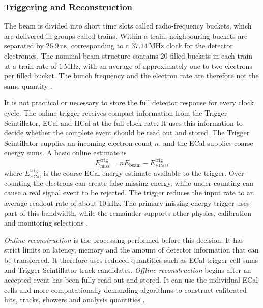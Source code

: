 \subsubsection{Triggering and Reconstruction}

The beam is divided into short time slots called radio-frequency buckets,
which are delivered in groups called trains. Within a train, neighbouring
buckets are separated by \(26.9\,\mathrm{ns}\), corresponding to a
\(37.14\,\mathrm{MHz}\) clock for the detector electronics. The nominal beam
structure contains 20 filled buckets in each train at a train rate of
\(1\,\mathrm{MHz}\), with an average of approximately one to two electrons
per filled bucket. The bunch frequency and the electron rate are therefore
not the same quantity \cite{ldmx2025-overview}.

It is not practical or necessary to store the full detector response for
every clock cycle. The online trigger receives compact information from the
Trigger Scintillator, ECal and HCal at the full clock rate. It uses this
information to decide whether the complete event should be read out and
stored. The Trigger Scintillator supplies an incoming-electron count \(n\),
and the ECal supplies coarse energy sums. A basic online estimate is
\begin{equation}
    E_{\mathrm{miss}}^{\mathrm{trig}}
    =
    nE_{\mathrm{beam}} - E_{\mathrm{ECal}}^{\mathrm{trig}} ,
\end{equation}
where \(E_{\mathrm{ECal}}^{\mathrm{trig}}\) is the coarse ECal energy estimate
available to the trigger.
Over-counting the electrons can create false missing energy, while
under-counting can cause a real signal event to be rejected. The trigger
reduces the input rate to an average readout rate of about
\(10\,\mathrm{kHz}\). The primary missing-energy trigger uses part of this
bandwidth, while the remainder supports other physics, calibration and
monitoring selections \cite{ldmx2025-overview}.

\emph{Online reconstruction} is the processing performed before this
decision. It has strict limits on latency, memory and the amount of detector
information that can be transferred. It therefore uses reduced quantities
such as ECal trigger-cell sums and Trigger Scintillator track candidates.
\emph{Offline reconstruction} begins after an accepted event has been fully
read out and stored. It can use the individual ECal cells and more
computationally demanding algorithms to construct calibrated hits, tracks,
showers and analysis quantities \cite{ldmx2025-overview}.

